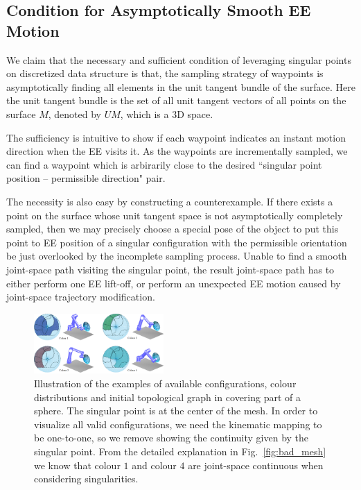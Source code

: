 \documentclass[Afour,sageh,times]{sagej}
\begin{document}
\subsection{Condition for Asymptotically Smooth EE Motion}\label{subsection_asymptotical}
We claim that the necessary and sufficient condition of leveraging singular points on discretized data structure is that, the sampling strategy of waypoints is asymptotically finding all elements in the unit tangent bundle of the surface. Here the unit tangent bundle is the set of all unit tangent vectors of all points on the surface $M$, denoted by $UM$, which is a 3D space. 

The sufficiency is intuitive to show if each waypoint indicates an instant motion direction when the EE visits it. 
As the waypoints are incrementally sampled, we can find a waypoint which is arbirarily close to the desired ``singular point position -- permissible direction" pair. 

The necessity is also easy by constructing a counterexample. If there exists a point on the surface whose unit tangent space is not asymptotically completely sampled, then we may precisely choose a special pose of the object to put this point to EE position of a singular configuration with the permissible orientation be just overlooked by the incomplete sampling process. Unable to find a smooth joint-space path visiting the singular point, the result joint-space path has to either perform one EE lift-off, or perform an unexpected EE motion caused by joint-space trajectory modification.

\begin{figure}[t]
\centering
\includegraphics[width = 0.44\textwidth]{figures/exp_central_sphere/ground_truth_demo_color_2}
\caption{Illustration of the examples of available configurations, colour distributions and initial topological graph in covering part of a sphere. 
The singular point is at the center of the mesh. 
In order to visualize all valid configurations, we need the kinematic mapping to be one-to-one, so we remove showing the continuity given by the singular point. 
From the detailed explanation in Fig.~\ref{fig:bad_mesh} we know that colour $1$ and colour $4$ are joint-space continuous when considering singularities. 
}\label{fig_ground_truth}
\end{figure}
\end{document}
